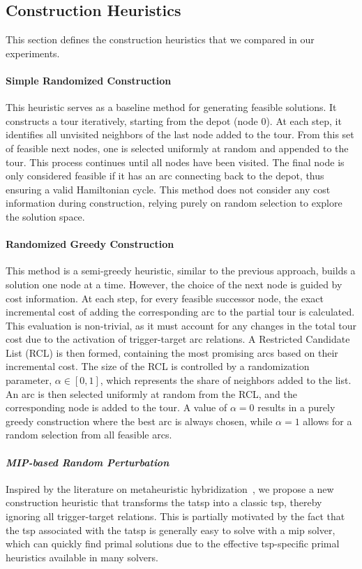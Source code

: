 \documentclass[twocolumn, switch]{article} %
\begin{document}
\subsection{Construction Heuristics}
This section defines the construction heuristics that we compared in our experiments.

\paragraph{Simple Randomized Construction}
This heuristic serves as a baseline method for generating feasible solutions.
It constructs a tour iteratively, starting from the depot (node 0).
At each step, it identifies all unvisited neighbors of the last node added to the tour.
From this set of feasible next nodes, one is selected uniformly at random and appended to the tour.
This process continues until all nodes have been visited.
The final node is only considered feasible if it has an arc connecting back to the depot, thus ensuring a valid Hamiltonian cycle.
This method does not consider any cost information during construction, relying purely on random selection to explore the solution space.

\paragraph{Randomized Greedy Construction}
This method is a semi-greedy heuristic, similar to the previous approach, builds a solution one node at a time.
However, the choice of the next node is guided by cost information. At each step, for every feasible successor node, the exact incremental cost of adding the corresponding arc to the partial tour is calculated. This evaluation is non-trivial, as it must account for any changes in the total tour cost due to the activation of trigger-target arc relations.
A Restricted Candidate List (RCL) is then formed, containing the most promising arcs based on their incremental cost. The size of the RCL is controlled by a randomization parameter, $\alpha \in [0,1]$, which represents the share of neighbors added to the list. An arc is then selected uniformly at random from the RCL, and the corresponding node is added to the tour. A value of $\alpha=0$ results in a purely greedy construction where the best arc is always chosen, while $\alpha=1$ allows for a random selection from all feasible arcs.
  
\paragraph{\textit{MIP-based Random Perturbation}}
Inspired by the literature on metaheuristic hybridization~\cite{Blum2016}, we propose a new construction heuristic that transforms the \gls{tatsp} into a classic \gls{tsp}, thereby ignoring all trigger-target relations.
This is partially motivated by the fact that the \gls{tsp} associated with the \gls{tatsp} is generally easy to solve with a \gls{mip} solver, which can quickly find primal solutions due to the effective \gls{tsp}-specific primal heuristics available in many solvers.
\end{document}
